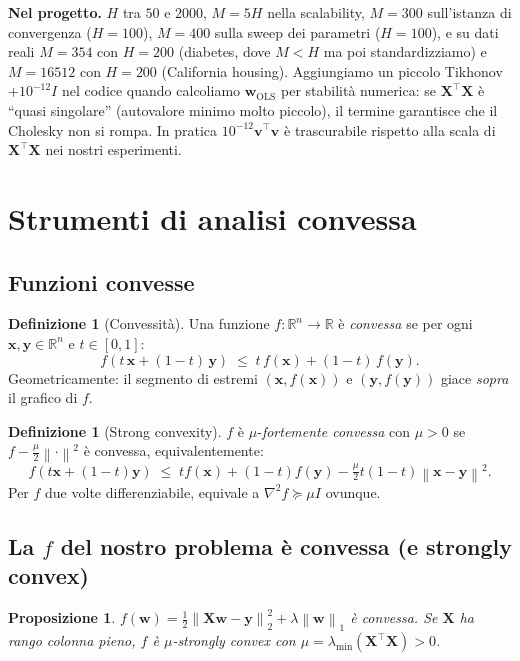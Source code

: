 \documentclass[11pt,a4paper]{article}
\newcommand{\R}{\mathbb{R}}
\newcommand{\norm}[1]{\left\|#1\right\|}
\newcommand{\bw}{\mathbf{w}}
\newcommand{\bx}{\mathbf{x}}
\newcommand{\by}{\mathbf{y}}
\newcommand{\bX}{\mathbf{X}}
\newcommand{\bv}{\mathbf{v}}
\newtheorem{proposition}[theorem]{Proposizione}
\theoremstyle{definition}
\newtheorem{definition}[theorem]{Definizione}
\begin{document}
\smallskip\textbf{Nel progetto.} $H$ tra $50$ e $2000$, $M=5H$ nella scalability, $M=300$ sull'istanza di convergenza ($H=100$), $M=400$ sulla sweep dei parametri ($H=100$), e su dati reali $M=354$ con $H=200$ (diabetes, dove $M<H$ ma poi standardizziamo) e $M=16512$ con $H=200$ (California housing). Aggiungiamo un piccolo Tikhonov $+10^{-12}I$ nel codice quando calcoliamo $\bw_{\text{OLS}}$ per stabilità numerica: se $\bX^\top\bX$ è ``quasi singolare'' (autovalore minimo molto piccolo), il termine garantisce che il Cholesky non si rompa. In pratica $10^{-12}\bv^\top\bv$ è trascurabile rispetto alla scala di $\bX^\top\bX$ nei nostri esperimenti.

\section{Strumenti di analisi convessa}
\label{sec:convex}

\subsection{Funzioni convesse}

\begin{definition}[Convessità]
Una funzione $f:\R^n\to\R$ è \emph{convessa} se per ogni $\bx,\by\in\R^n$ e $t\in[0,1]$:
\[
f(t\,\bx + (1-t)\,\by) \;\le\; t\,f(\bx) + (1-t)\,f(\by).
\]
Geometricamente: il segmento di estremi $(\bx,f(\bx))$ e $(\by,f(\by))$ giace \emph{sopra} il grafico di $f$.
\end{definition}

\begin{definition}[Strong convexity]
$f$ è $\mu$-\emph{fortemente convessa} con $\mu>0$ se $f - \tfrac{\mu}{2}\norm{\cdot}^2$ è convessa, equivalentemente:
\[
f(t\bx+(1-t)\by) \;\le\; tf(\bx) + (1-t)f(\by) - \tfrac{\mu}{2}t(1-t)\norm{\bx-\by}^2.
\]
Per $f$ due volte differenziabile, equivale a $\nabla^2 f \succeq \mu I$ ovunque.
\end{definition}

\subsection{La $f$ del nostro problema è convessa (e strongly convex)}

\begin{proposition}
$f(\bw) = \tfrac{1}{2}\norm{\bX\bw-\by}_2^2 + \lambda\norm{\bw}_1$ è convessa. Se $\bX$ ha rango colonna pieno, $f$ è $\mu$-strongly convex con $\mu = \lambda_{\min}(\bX^\top\bX) > 0$.
\end{proposition}
\end{document}
